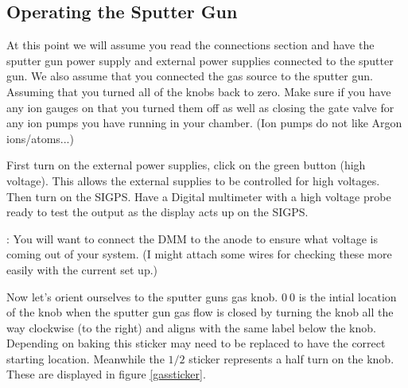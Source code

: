 \documentclass[11pt,a4paper]{report}
\begin{document}


\subsection{Operating the Sputter Gun}
At this point we will assume you read the connections section and have the sputter gun power supply and external power supplies connected to the sputter gun. We also assume that you connected the gas source to the sputter gun. Assuming that you turned all of the knobs back to zero. Make sure if you have any ion gauges on that you turned them off as well as closing the gate valve for any ion pumps you have running in your chamber. (Ion pumps do not like Argon ions/atoms...)

First turn on the external power supplies, click on the green button (high voltage). This allows the external supplies to be controlled for high voltages. Then turn on the SIGPS. Have a Digital multimeter with a high voltage probe ready to test the output as the display acts up on the SIGPS.

{\boxed:  You will want to connect the DMM to the anode to ensure what voltage is coming out of your system. (I might attach some wires for checking these more easily with the current set up.)  }

Now let's orient ourselves to the sputter guns gas knob. $0 \ 0 $ is the intial location of the knob when the sputter gun gas flow is closed by turning the knob all the way clockwise (to the right) and aligns with the same label below the knob. Depending on baking this sticker may need to be replaced to have the correct starting location. Meanwhile the $1 / 2 $ sticker represents a half turn on the knob. These are displayed in figure \ref{gassticker}. 
\end{document}
